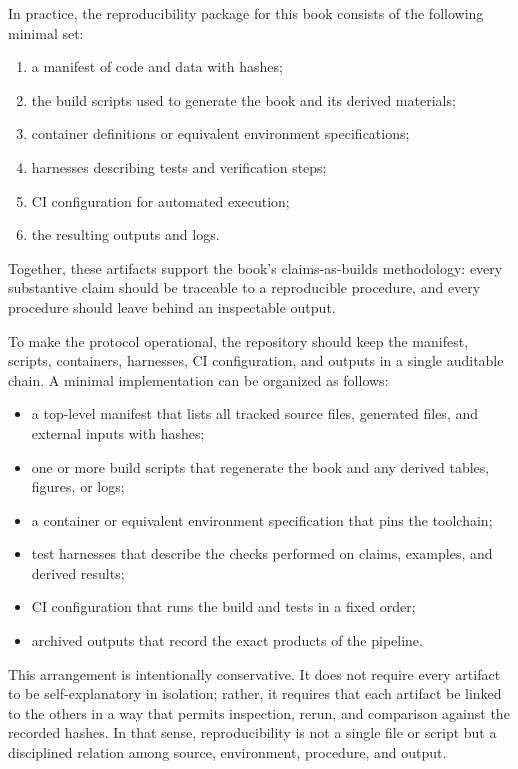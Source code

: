 \documentclass[11pt]{article}
\begin{document}
In practice, the reproducibility package for this book consists of the following minimal set:
\begin{enumerate}
  \item a manifest of code and data with hashes;
  \item the build scripts used to generate the book and its derived materials;
  \item container definitions or equivalent environment specifications;
  \item harnesses describing tests and verification steps;
  \item CI configuration for automated execution;
  \item the resulting outputs and logs.
\end{enumerate}

Together, these artifacts support the book's claims-as-builds methodology: every substantive claim should be traceable to a reproducible procedure, and every procedure should leave behind an inspectable output.

To make the protocol operational, the repository should keep the manifest, scripts, containers, harnesses, CI configuration, and outputs in a single auditable chain. A minimal implementation can be organized as follows:
\begin{itemize}
  \item a top-level manifest that lists all tracked source files, generated files, and external inputs with hashes;
  \item one or more build scripts that regenerate the book and any derived tables, figures, or logs;
  \item a container or equivalent environment specification that pins the toolchain;
  \item test harnesses that describe the checks performed on claims, examples, and derived results;
  \item CI configuration that runs the build and tests in a fixed order;
  \item archived outputs that record the exact products of the pipeline.
\end{itemize}

This arrangement is intentionally conservative. It does not require every artifact to be self-explanatory in isolation; rather, it requires that each artifact be linked to the others in a way that permits inspection, rerun, and comparison against the recorded hashes. In that sense, reproducibility is not a single file or script but a disciplined relation among source, environment, procedure, and output.
\end{document}
